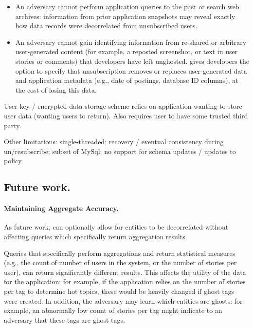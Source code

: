 {\begin{itemize}
    \item An adversary cannot perform application queries to the past or search web archives:
    information from prior application snapshots may reveal
    exactly how data records were decorrelated from unsubscribed users.

    \item An adversary cannot gain identifying information from re-shared or arbitrary
        user-generated content (for example, a reposted screenshot, or text in user stories or
        comments) that developers have left unghosted.
        \name gives developers the option to specify that unsubscription removes or replaces
        user-generated data and application metadata (e.g., date of postings, database ID columns),
        at the cost of losing this data.
\end{itemize}

User key / encrypted data storage scheme relies on application wanting to store user data (wanting
users to return). Also requires user to have some trusted third party.

Other limitations:
single-threaded;
recovery / eventual consistency during un/resubscribe;
subset of MySql;
no support for schema updates / updates to policy

\subsection{Future work.}
\paragraph{Maintaining Aggregate Accuracy.}
As future work, \sys can optionally allow for entities to be decorrelated without affecting queries which
specifically return aggregation results.

Queries that specifically perform aggregations and return statistical measures (e.g.,
the count of number of users in the system, or the number of stories per user), can return
significantly different results. This affects the utility of the data for the application: for
example, if the application relies on the number of stories per tag to determine hot topics, these
would be heavily changed if ghost tags were created.  In addition, the adversary may learn which
entities are ghosts: for example, an abnormally low count of stories per tag might indicate to an
adversary that these tags are ghost tags.  

}
